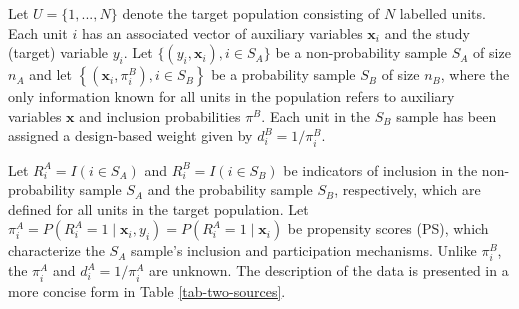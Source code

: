 \documentclass[
]{jss}
\begin{document}
Let \(U=\{1,..., N\}\) denote the target population consisting of \(N\)
labelled units. Each unit \(i\) has an associated vector of auxiliary
variables \(\boldsymbol{x}_{i}\) and the study (target) variable
\(y_{i}\). Let \(\{ (y_i, \boldsymbol{x}_i), i \in S_A\}\) be a
non-probability sample \(S_A\) of size \(n_A\) and let
\(\left\{\left(\boldsymbol{x}_i, \pi_{i}^B\right), i \in S_B\right\}\)
be a probability sample \(S_B\) of size \(n_B\), where the only
information known for all units in the population refers to auxiliary
variables \(\boldsymbol{x}\) and inclusion probabilities \(\pi^B\). Each
unit in the \(S_B\) sample has been assigned a design-based weight given
by \(d_i^B = 1/\pi_i^B\).

Let \(R_i^A=I(i \in S_A)\) and \(R_i^B=I(i \in S_B)\) be indicators of
inclusion in the non-probability sample \(S_A\) and the probability
sample \(S_B\), respectively, which are defined for all units in the
target population. Let
\(\pi_i^A=P(R_i^A=1 \mid \boldsymbol{x}_i, y_i)=P(R_i^A=1 \mid \boldsymbol{x}_i)\)
be propensity scores (PS), which characterize the \(S_A\) sample's
inclusion and participation mechanisms. Unlike \(\pi_i^B\), the
\(\pi_i^A\) and \(d_i^A=1/\pi_i^A\) are unknown. The description of the
data is presented in a more concise form in Table \ref{tab-two-sources}.

\begin{table}[ht!]
    \centering
    \caption{Two-sample setting}
    \label{tab-two-sources}
\end{table}
\end{document}
